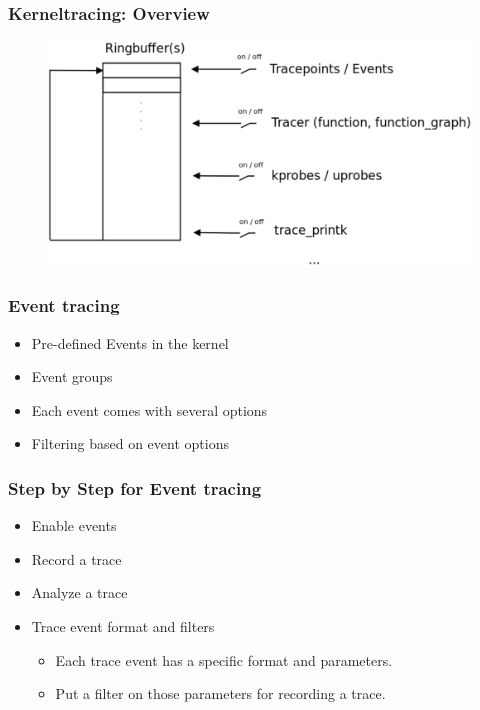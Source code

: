 % 
\begin{frame}[fragile]
    \frametitle{Kerneltracing: Overview}

% 
  \begin{figure}
    \centering
    \includegraphics[width=0.7\linewidth]{figs/trace-overview.png}
	\end{figure}


% 
\end{frame}
\begin{frame}[fragile]
    \frametitle{Event tracing}


    \begin{itemize}
        \item Pre-defined Events in the kernel
        \item Event groups
        \item Each event comes with several options
        \item Filtering based on event options
    \end{itemize}
% 
\end{frame}
\begin{frame}[fragile]
    \frametitle{Step by Step for Event tracing}


    \begin{itemize}
        \item Enable events
        \item Record a trace
        \item Analyze a trace
        \item Trace event format and filters
	    \begin{itemize}
	        \item Each trace event has a specific format and parameters.
          \item Put a filter on those parameters for recording a trace.
      \end{itemize}
    \end{itemize}
% 
\end{frame}
